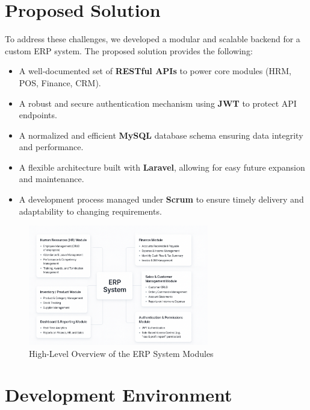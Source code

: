 \section{Proposed Solution}
To address these challenges, we developed a modular and scalable backend for a custom ERP system. The proposed solution provides the following: 
\begin{itemize}
    \item A well-documented set of \textbf{RESTful APIs} to power core modules (HRM, POS, Finance, CRM).
    \item A robust and secure authentication mechanism using \textbf{JWT} to protect API endpoints.
    \item A normalized and efficient \textbf{MySQL} database schema ensuring data integrity and performance.
    \item A flexible architecture built with \textbf{Laravel}, allowing for easy future expansion and maintenance.
    \item A development process managed under \textbf{Scrum} to ensure timely delivery and adaptability to changing requirements.
\end{itemize}
\begin{figure}[H]
    \centering
    \includegraphics[width=0.7\textwidth]{chapters/chapter 1/figures/ERP_SYSTEM.png}
    \caption{High-Level Overview of the ERP System Modules}
    \label{fig:erp_modules}
\end{figure}

\section{Development Environment}
